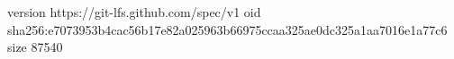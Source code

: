version https://git-lfs.github.com/spec/v1
oid sha256:e7073953b4cac56b17e82a025963b66975ccaa325ae0dc325a1aa7016e1a77c6
size 87540
